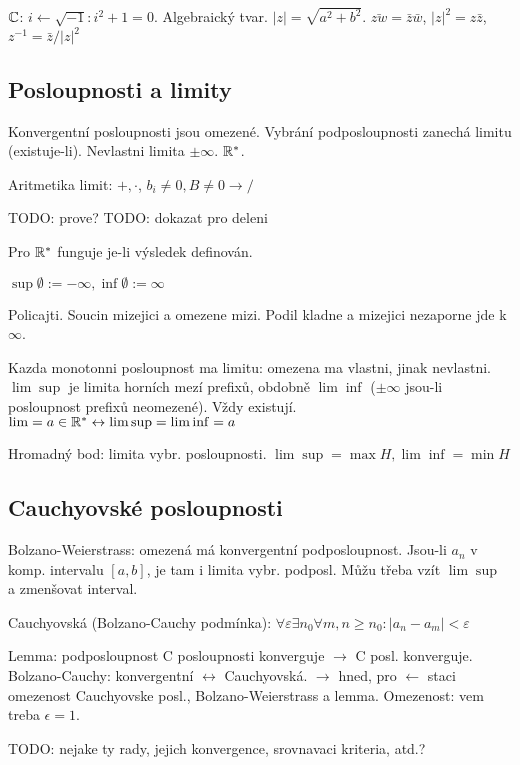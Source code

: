 $\mathbb{C}$: $i\gets\sqrt{-1}:i^2+1=0$. Algebraický tvar.
$|z|=\sqrt{a^2+b^2}$. $\bar{zw}=\bar{z}\bar{w}$, $|z|^2=z\bar{z}$,
$z^{-1}=\bar{z}/|z|^2$


\subsection{Posloupnosti a limity}
Konvergentní posloupnosti jsou omezené.
Vybrání podposloupnosti zanechá limitu (existuje-li).
Nevlastni limita $\pm\infty$. $\mathbb{R}^*$.

Aritmetika limit: $+,\cdot$, $b_i\neq 0,B\neq 0\rightarrow/$

TODO: prove?
TODO: dokazat pro deleni

Pro $\mathbb{R}^*$ funguje je-li výsledek definován.

$\sup\emptyset:=-\infty,\inf\emptyset:=\infty$

Policajti. Soucin mizejici a omezene mizi.
Podil kladne a mizejici nezaporne jde k $\infty$.

Kazda monotonni posloupnost ma limitu: omezena ma vlastni, jinak nevlastni.
$\lim\sup$ je limita horních mezí prefixů, obdobně $\lim\inf$ ($\pm\infty$
jsou-li posloupnost prefixů neomezené). Vždy existují.
$\lim=a\in\mathbb{R}^*\leftrightarrow\lim\sup=\lim\inf=a$

Hromadný bod: limita vybr. posloupnosti. $\lim\sup=\max H,\lim\inf=\min H$

\subsection{Cauchyovské posloupnosti}
Bolzano-Weierstrass: omezená má konvergentní podposloupnost.
Jsou-li $a_n$ v komp. intervalu $[a,b]$, je tam i limita vybr. podposl.
Můžu třeba vzít $\lim\sup$ a zmenšovat interval.

Cauchyovská (Bolzano-Cauchy podmínka):
$\forall\varepsilon\exists n_0\forall m,n\geq n_0: |a_n-a_m|<\varepsilon$

Lemma: podposloupnost C posloupnosti konverguje $\rightarrow$ C posl.
konverguje.
Bolzano-Cauchy: konvergentní $\leftrightarrow$ Cauchyovská. $\rightarrow$
hned, pro $\leftarrow$ staci omezenost Cauchyovske posl., Bolzano-Weierstrass
a lemma. Omezenost: vem treba $\epsilon=1$.

TODO: nejake ty rady, jejich konvergence, srovnavaci kriteria, atd.?
